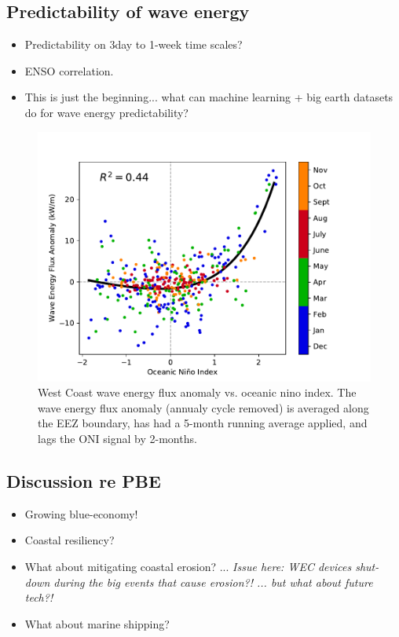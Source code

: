 \subsection{Predictability of wave energy}

\begin{itemize}
\item Predictability on 3day to 1-week time scales?
\item ENSO correlation.
\item This is just the beginning... what can machine learning + big earth datasets do for wave energy predictability?
\end{itemize}


\begin{figure}[ht]
  \centering
  \includegraphics[width=\textwidth]{../fig/ENSO-Comparison.wc.pdf}
  \caption{West Coast wave energy flux anomaly vs. oceanic nino index. The wave energy flux anomaly (annualy cycle removed) is averaged along the EEZ boundary, has had a 5-month running average applied, and lags the ONI signal by 2-months.}
  \label{fig:wc-nino}
\end{figure}


\subsection{Discussion re PBE}

\begin{itemize}
\item Growing blue-economy!
\item Coastal resiliency?
\item What about mitigating coastal erosion? ... {\it Issue here: WEC devices shut-down during the big events that cause erosion?! ... but what about future tech?!}
\item What about marine shipping?
\end{itemize}


